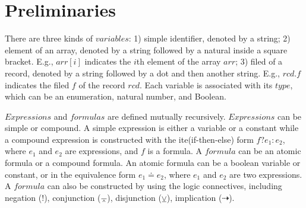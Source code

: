 \documentclass[conference]{IEEEtran}
\def \eqc {\doteq }
\def \andc {\barwedge }
\def \negc {!}
\def \orc {\veebar }
\begin{document}
{%
\section{Preliminaries}\label{sec:Preliminaries}
\vspace{-5pt}
There are three kinds of $variables$:
1) simple identifier, denoted by a string;
2) element of an array, denoted by a string followed by a natural inside a square bracket. E.g., $arr[i]$ indicates the $i$th element of the array $arr$;
3) filed of a record, denoted by a string followed by a dot and then another string. E.g., $rcd.f$ indicates the filed $f$ of the record $rcd$.
Each variable is associated with its $type$, which can be an enumeration, natural number, and Boolean.



$Expressions$ and $formulas$ are defined mutually recursively. $Expressions$ can be simple or compound. A simple expression is either a variable or a constant while a compound expression is constructed with the ite(if-then-else) form $f?e_1:e_2$, where $e_1$ and $e_2$ are expressions, and $f$ is a formula.
A $formula$ can be an atomic formula or a compound formula. An atomic formula can be a boolean variable or  constant, or in the equivalence form $e_1\eqc e_2$, where $e_1$ and $e_2$ are two expressions. A $formula$ can also be constructed by using the logic connectives, including negation ($\negc$), conjunction ($\andc$), disjunction ($\orc$), implication ($\dashrightarrow$). %

}
\end{document}
